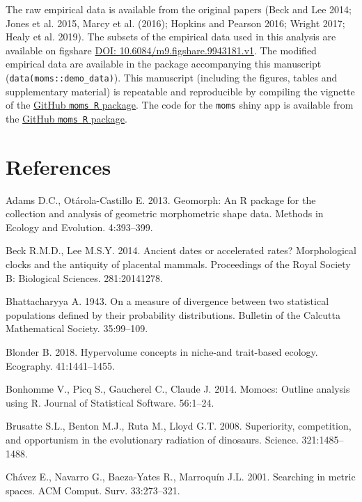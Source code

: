 \documentclass[]{article}
\begin{document}
The raw empirical data is available from the original papers (Beck and
Lee 2014; Jones et al. 2015, Marcy et al. (2016); Hopkins and Pearson
2016; Wright 2017; Healy et al. 2019). The subsets of the empirical data
used in this analysis are available on figshare
\href{https://doi.org/10.6084/m9.figshare.9943181.v1}{DOI:
10.6084/m9.figshare.9943181.v1}. The modified empirical data are
available in the package accompanying this manuscript
(\texttt{data(moms::demo\_data)}). This manuscript (including the
figures, tables and supplementary material) is repeatable and
reproducible by compiling the vignette of the
\href{https://github/TGuillerme/moms}{GitHub \texttt{moms\ R} package}.
The code for the \texttt{moms} shiny app is available from the
\href{https://github/TGuillerme/moms}{GitHub \texttt{moms\ R} package}.

\section*{References}\label{references}

\hypertarget{refs}{}
\hypertarget{ref-adams2013geomorph}{}
Adams D.C., Otárola-Castillo E. 2013. Geomorph: An R package for the
collection and analysis of geometric morphometric shape data. Methods in
Ecology and Evolution. 4:393--399.

\hypertarget{ref-beck2014}{}
Beck R.M.D., Lee M.S.Y. 2014. Ancient dates or accelerated rates?
Morphological clocks and the antiquity of placental mammals. Proceedings
of the Royal Society B: Biological Sciences. 281:20141278.

\hypertarget{ref-bhattacharyya1943}{}
Bhattacharyya A. 1943. On a measure of divergence between two
statistical populations defined by their probability distributions.
Bulletin of the Calcutta Mathematical Society. 35:99--109.

\hypertarget{ref-blonder2018}{}
Blonder B. 2018. Hypervolume concepts in niche-and trait-based ecology.
Ecography. 41:1441--1455.

\hypertarget{ref-momocs}{}
Bonhomme V., Picq S., Gaucherel C., Claude J. 2014. Momocs: Outline
analysis using R. Journal of Statistical Software. 56:1--24.

\hypertarget{ref-brusatte2008}{}
Brusatte S.L., Benton M.J., Ruta M., Lloyd G.T. 2008. Superiority,
competition, and opportunism in the evolutionary radiation of dinosaurs.
Science. 321:1485--1488.

\hypertarget{ref-cursedimensionality}{}
Chávez E., Navarro G., Baeza-Yates R., Marroquín J.L. 2001. Searching in
metric spaces. ACM Comput. Surv. 33:273--321.
\end{document}
